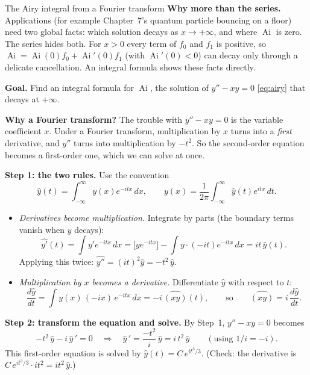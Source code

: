 \documentclass[11pt]{beamer}
\providecommand{\Ai}{\operatorname{Ai}}
\begin{document}
\begin{frame}[allowframebreaks=1.00]{The Airy integral from a Fourier transform}
\footnotesize
\textbf{Why more than the series.} Applications (for example Chapter~7's quantum particle bouncing
on a floor) need two global facts: which solution decays as \(x\to+\infty\), and where \(\Ai\) is zero.
The series hides both. For \(x>0\) every term of \(f_0\) and \(f_1\) is positive, so
\(\Ai=\Ai(0)f_0+\Ai'(0)f_1\) (with \(\Ai'(0)<0\)) can decay only through a delicate cancellation. An integral
formula shows these facts directly.

\textbf{Goal.} Find an integral formula for \(\Ai\), the solution of \(y''-xy=0\) \eqref{eq:airy} that decays at
\(+\infty\).

\textbf{Why a Fourier transform?} The trouble with \(y''-xy=0\) is the variable coefficient \(x\). Under a
Fourier transform, multiplication by \(x\) turns into a \emph{first} derivative, and \(y''\) turns into
multiplication by \(-t^2\). So the second-order equation becomes a first-order one, which we can
solve at once.


\textbf{Step 1: the two rules.} Use the convention
\[
 \widehat y(t)=\int_{-\infty}^{\infty}y(x)e^{-itx}\,dx,
 \qquad
 y(x)=\frac1{2\pi}\int_{-\infty}^{\infty}\widehat y(t)e^{itx}\,dt .
\]
\begin{itemize}
  \item \emph{Derivatives become multiplication.} Integrate by parts (the boundary terms vanish when
        \(y\) decays):
        \[
         \widehat{y'}(t)=\int y'e^{-itx}\,dx=\bigl[ye^{-itx}\bigr]-\int y\cdot(-it)e^{-itx}\,dx=it\,\widehat y(t).
        \]
        Applying this twice: \(\widehat{y''}=(it)^2\widehat y=-t^2\,\widehat y\).
  \item \emph{Multiplication by \(x\) becomes a derivative.} Differentiate \(\widehat y\) with respect to \(t\):
        \[
         \frac{d\widehat y}{dt}=\int y(x)\,(-ix)\,e^{-itx}\,dx=-i\,\widehat{(xy)}(t),
         \qquad\text{so}\qquad \widehat{(xy)}=i\,\frac{d\widehat y}{dt}.
        \]
\end{itemize}


\textbf{Step 2: transform the equation and solve.} By Step~1, \(y''-xy=0\) becomes
\[
 -t^2\,\widehat y-i\,\widehat y\,'=0
 \quad\Longrightarrow\quad
 \widehat y\,'=\frac{-t^2}{i}\,\widehat y=i\,t^2\,\widehat y
 \qquad(\text{using }1/i=-i).
\]
This first-order equation is solved by \(\widehat y(t)=C\,e^{it^3/3}\). (Check: the derivative is
\(C\,e^{it^3/3}\cdot it^2=it^2\,\widehat y\).)


\end{frame}
\end{document}
